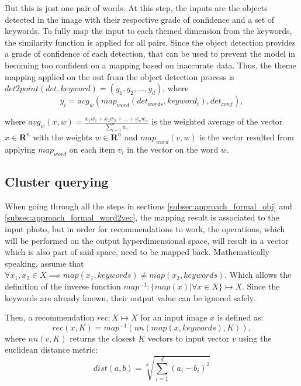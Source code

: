 But this is just one pair of words. At this step, the inputs are the objects detected in the image with their respective grade of confidence and a set of keywords. To fully map the input to each themed dimension from the keywords, the similarity function is applied for all pairs. Since the object detection provides a grade of confidence of each detection, that can be used to prevent the model in becoming too confident on a mapping based on inaccurate data. Thus, the theme mapping applied on the out from the object detection process is $ det2point(det, keyword) = (y_1, y_2, ..., y_d) $, where 
$$ y_i = avg_{w}(map_{word} (det_{words}, keyword_i) , det_{conf} ) ,$$

where $avg_{w}(x, w) = \frac{x_1 w_1 + x_2 w_2 + ... + x_n w_n}{\sum_{i=1}^{n}{w_i}}$ is the weighted average of the vector $x \in \mathbf{R}^n$ with the weights $w \in \mathbf{R}^n$ and $map_{word} (v, w)$ is the vector resulted from applying $map_{word}$ on each item $v_i$ in the vector on the word $w$.

\subsection{Cluster querying}
\label{subsec:approach_formal_cluster}

When going through all the steps in sections \ref{subsec:approach_formal_obj} and \ref{subsec:approach_formal_word2vec}, the mapping result is associated to the input photo, but in order for recommendations to work, the operations, which will be performed on the output hyperdimensional space, will result in a vector which is also part of said space, need to be mapped back. Mathematically speaking, assume that $\forall x_1, x_2 \in X \implies map(x_1, keywords) \neq map(x_2, keywords)$. Which allows the definition of the inverse function $map^{-1} : \{ map(x) | \forall x \in X \} \mapsto X$. Since the keywords are already known, their output value can be ignored safely.

Then, a recommendation $rec: X \mapsto X$ for an input image $x$ is defined as:
$$rec(x, K) = map^{-1}(nn(map(x, keywords), K)),$$
where $nn(v, K)$ returns the closest $K$ vectors to input vector $v$ using the euclidean distance metric:
$$ dist(a, b) = \sqrt[d]{\sum_{i=1}^{d}{(a_i - b_i)^2}} $$
